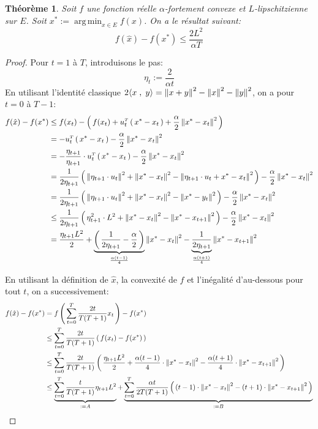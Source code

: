 \documentclass[11pt]{article}
\DeclareMathOperator*{\argmin}{arg\,min} %
\newcommand{\transpose}[1]{\ensuremath{#1^{\scriptscriptstyle T}}}
\newcommand{\dotpourvariable}{\:\cdot\:}
\newcommand{\ifempty}[3]{\ifx\hfuzz#1\hfuzz #2 \else #3\fi}
\newcommand{\norme}[1]{\left\lVert\ifempty{#1}{\dotpourvariable}{#1}\right\rVert}
\newcommand{\prt}[1]{\left( \, #1  \, \right)}
\newcommand{\ps}[2]{ \langle #1 \;,\; #2  \rangle}
\newtheorem{theorem}{Théorème}[section]
\begin{document}
\begin{theorem}

Soit $f$ une fonction réelle $\alpha$-fortement convexe et $L$-lipschitzienne sur
$E$. Soit $x^{*}:= \argmin_{x\in E} f(x)$. On a le résultat suivant:
\begin{equation}
f(\hat{x})-f(x^{*}) \leq \frac{2 L^2}{\alpha T}
\end{equation}
\end{theorem}

\begin{proof}
Pour $t=1$ à $T$, introduisons le pas:
\begin{equation}
  \eta_t := \frac{2}{\alpha t}
\end{equation}
En utilisant l'identité classique $2\ps{x}{y} = \norme{x+y}^2-\norme{x}^2-\norme{y}^2$, on a pour $t=0$ à $T-1$:
\begin{align*}
f(\hat{x})-f(x^{*}) &\leq f(x_t)-\prt{f(x_t) + \transpose{u_t}\prt{x^{*}-x_t}
+ \frac{\alpha}{2} \norme{x^{*}-x_t}^2}\\
&= -\transpose{u_t}\prt{x^{*}-x_t}
- \frac{\alpha}{2} \norme{x^{*}-x_t}^2\\
&= -\frac{\eta_{t+1}}{\eta_{t+1}} \cdot \transpose{u_t}\prt{x^{*}-x_t}
- \frac{\alpha}{2} \norme{x^{*}-x_t}^2\\
&= \frac{1}{2 \eta_{t+1} }\prt{\norme{\eta_{t+1} \cdot u_t}^2+\norme{x^{*}-x_t}^2-\norme{\eta_{t+1} \cdot u_t+x^{*}-x_t}^2
}- \frac{\alpha}{2} \norme{x^{*}-x_t}^2\\
&= \frac{1}{2 \eta_{t+1} }\prt{\norme{\eta_{t+1} \cdot u_t}^2+\norme{x^{*}-x_t}^2-\norme{ x^{*}-y_t}^2
}- \frac{\alpha}{2} \norme{x^{*}-x_t}^2\\
&\leq  \frac{1}{2 \eta_{t+1} }\prt{\eta_{t+1}^2\cdot L^2+\norme{x^{*}-x_t}^2-\norme{x^{*}-x_{t+1}}^2
}- \frac{\alpha}{2} \norme{x^{*}-x_t}^2\\
&= \frac{\eta_{t+1} L^2}{2} + \underbrace{\prt{\frac{1}{2 \eta_{t+1} } - \frac{\alpha}{2}}}_{\frac{\alpha (t-1)}{4}} \norme{x^{*}-x_t}^2
- \underbrace{\frac{1}{2 \eta_{t+1} }}_{\frac{\alpha (t+1)}{4}} \norme{x^{*}-x_{t+1}}^2
\end{align*}

En utilisant la définition de $\hat{x}$, la convexité de $f$ et l'inégalité d'au-dessous pour tout $t$, on a successivement:
\begin{align*}
  f(\hat{x})-f(x^{*}) &= f\prt{\sum_{t=0}^T \frac{2t}{T(T+1)} x_t}-f(x^{*})\\
  &\leq  \sum_{t=0}^T \frac{2t}{T(T+1)} \prt{f(x_t)-f(x^{*})}\\
  &\leq  \sum_{t=0}^T \frac{2t}{T(T+1)} \prt{\frac{\eta_{t+1} L^2}{2}+\frac{\alpha (t-1)}{4} \cdot \norme{x^{*}-x_t}^2-\frac{\alpha (t+1)}{4} \cdot  \norme{x^{*}-x_{t+1}}^2}\\
  &\leq  \underbrace{\sum_{t=0}^T \frac{t}{T(T+1)} \eta_{t+1} L^2}_{:=A}+\underbrace{\sum_{t=0}^T \frac{\alpha t}{2T(T+1)}  \prt{(t-1) \cdot \norme{x^{*}-x_t}^2-(t+1) \cdot  \norme{x^{*}-x_{t+1}}^2}}_{:=B}\\
\end{align*}


\end{proof}
\end{document}
